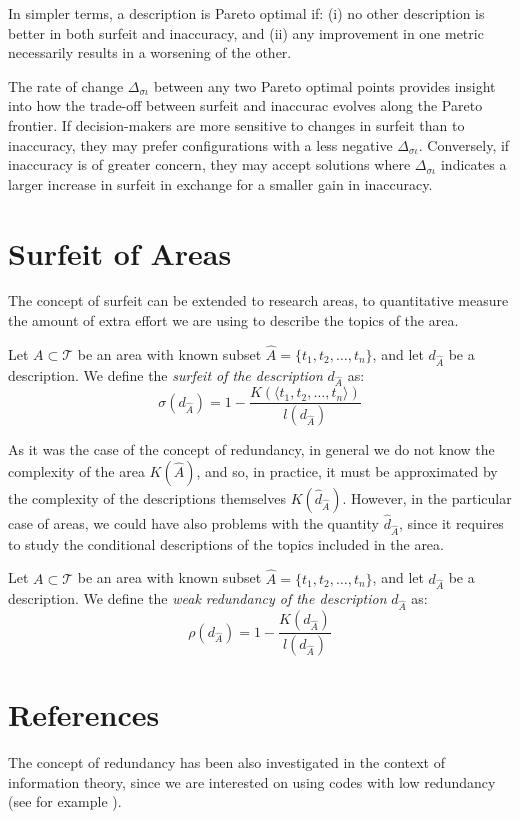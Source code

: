 In simpler terms, a description is Pareto optimal if: (i) no other description is better in both surfeit and inaccuracy, and (ii) any improvement in one metric necessarily results in a worsening of the other.

The rate of change $\Delta_{\sigma \iota}$ between any two Pareto optimal points provides insight into how the trade-off between surfeit and inaccurac evolves along the Pareto frontier. If decision-makers are more sensitive to changes in surfeit than to inaccuracy, they may prefer configurations with a less negative $\Delta_{\sigma \iota}$. Conversely, if inaccuracy is of greater concern, they may accept solutions where $\Delta_{\sigma \iota}$ indicates a larger increase in surfeit in exchange for a smaller gain in inaccuracy.

%
%

\section{Surfeit of Areas}
\label{sec:surfeit_areas}

The concept of surfeit can be extended to research areas, to quantitative measure the amount of extra effort we are using to describe the topics of the area.

\begin{definition}
Let $A \subset \mathcal{T}$ be an area with known subset $\hat{A} = \{t_1, t_2, \ldots, t_n\}$, and let $d_{\hat{A}}$ be a description. We define the \emph{surfeit of the description} $d_{\hat{A}}$ as:
\[
\sigma \left( d_{\hat{A}} \right) = 1  - \frac{K( \langle t_1, t_2, \ldots, t_n \rangle )}{l \left( d_{\hat{A}} \right)}
\]
\end{definition}

As it was the case of the concept of redundancy, in general we do not know the complexity of the area $K(\hat{A})$, and so, in practice, it must be approximated by the complexity of the descriptions themselves $K(\hat{d}_{\hat{A}})$. However, in the particular case of areas, we could have also problems with the quantity $\hat{d}_{\hat{A}}$, since it requires to study the conditional descriptions of the topics included in the area.

\begin{definition}
Let $A \subset \mathcal{T}$ be an area with known subset $\hat{A} = \{t_1, t_2, \ldots, t_n\}$, and let $d_{\hat{A}}$ be a description. We define the \emph{weak redundancy of the description} $d_{\hat{A}}$ as:
\[
\rho(d_{\hat{A}}) =  1  - \frac{K \left( d_{\hat{A}} \right)}{l \left( d_{\hat{A}} \right)}
\]
\end{definition}

%
%

\section*{References}

The concept of redundancy has been also investigated in the context of information theory, since we are interested on using codes with low redundancy (see for example \cite{abramson1963information}).

